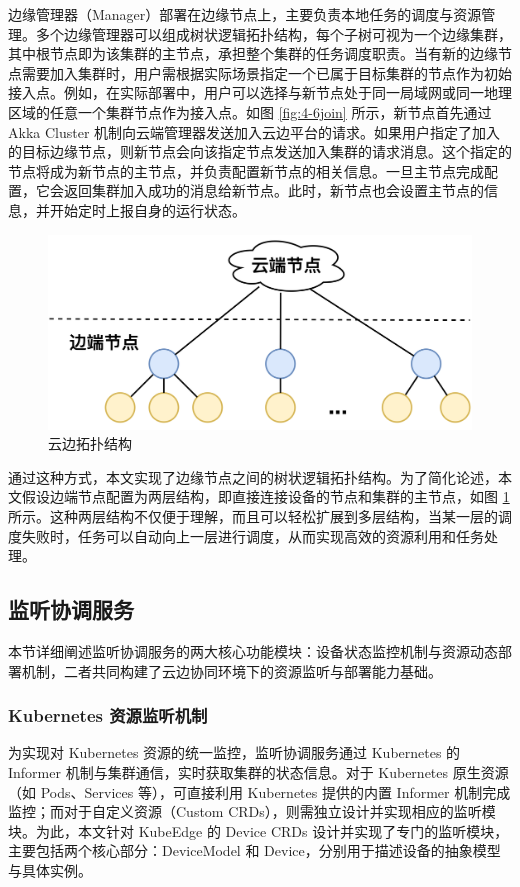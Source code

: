 边缘管理器（Manager）部署在边缘节点上，主要负责本地任务的调度与资源管理。多个边缘管理器可以组成树状逻辑拓扑结构，每个子树可视为一个边缘集群，其中根节点即为该集群的主节点，承担整个集群的任务调度职责。当有新的边缘节点需要加入集群时，用户需根据实际场景指定一个已属于目标集群的节点作为初始接入点。例如，在实际部署中，用户可以选择与新节点处于同一局域网或同一地理区域的任意一个集群节点作为接入点。如图 \ref{fig:4-6join} 所示，新节点首先通过 Akka Cluster 机制向云端管理器发送加入云边平台的请求。如果用户指定了加入的目标边缘节点，则新节点会向该指定节点发送加入集群的请求消息。这个指定的节点将成为新节点的主节点，并负责配置新节点的相关信息。一旦主节点完成配置，它会返回集群加入成功的消息给新节点。此时，新节点也会设置主节点的信息，并开始定时上报自身的运行状态。

\begin{figure}[ht]
  \centering
  \includegraphics[width=0.6\linewidth]{pics/4-5arc.png}
  \caption{云边拓扑结构}
  \label{fig:4-5arc}
\end{figure}

通过这种方式，本文实现了边缘节点之间的树状逻辑拓扑结构。为了简化论述，本文假设边端节点配置为两层结构，即直接连接设备的节点和集群的主节点，如图 \ref{fig:4-5arc} 所示。这种两层结构不仅便于理解，而且可以轻松扩展到多层结构，当某一层的调度失败时，任务可以自动向上一层进行调度，从而实现高效的资源利用和任务处理。

\subsection{监听协调服务}

本节详细阐述监听协调服务的两大核心功能模块：设备状态监控机制与资源动态部署机制，二者共同构建了云边协同环境下的资源监听与部署能力基础。

\subsubsection{Kubernetes 资源监听机制}

为实现对 Kubernetes 资源的统一监控，监听协调服务通过 Kubernetes 的 Informer 机制与集群通信，实时获取集群的状态信息。对于 Kubernetes 原生资源（如 Pods、Services 等），可直接利用 Kubernetes 提供的内置 Informer 机制完成监控；而对于自定义资源（Custom CRDs），则需独立设计并实现相应的监听模块。为此，本文针对 KubeEdge 的 Device CRDs 设计并实现了专门的监听模块，主要包括两个核心部分：DeviceModel 和 Device，分别用于描述设备的抽象模型与具体实例。

